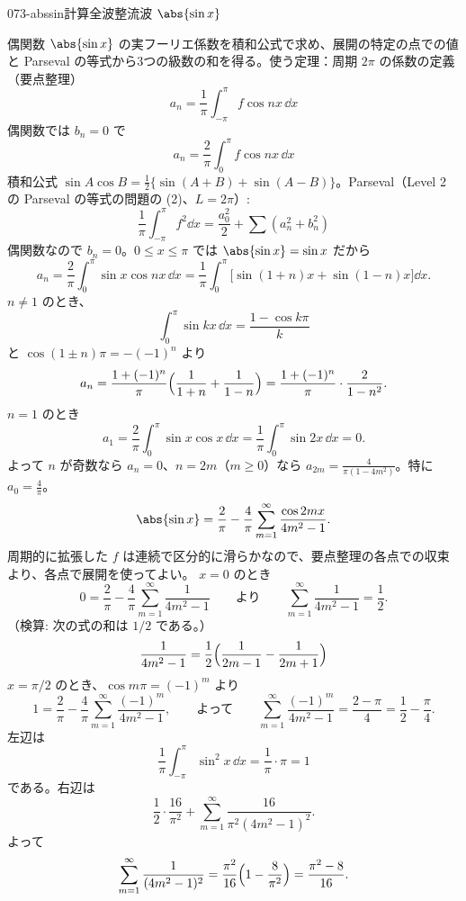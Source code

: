 \documentclass[uplatex,dvipdfmx,a4paper,11pt]{jsarticle}
\begin{document}
\begin{mondai}{073-abssin}{計算}{全波整流波 $\abs{\sin x}$}
\begin{kizuki}
\end{kizuki}
\begin{tadashii}
\houshin 偶関数 $\abs{\sin x}$ の実フーリエ係数を積和公式で求め、展開の特定の点での値と Parseval の等式から3つの級数の和を得る。使う定理：周期 $2\pi$ の係数の定義（要点整理）
\[
a_n=\frac{1}{\pi}\int_{-\pi}^{\pi}f\cos nx\,\dd x
\]
偶関数では $b_n=0$ で
\[
a_n=\frac{2}{\pi}\int_{0}^{\pi}f\cos nx\,\dd x
\]
積和公式 $\sin A\cos B=\frac{1}{2}\{\sin(A+B)+\sin(A-B)\}$。Parseval（Level 2 の Parseval の等式の問題の (2)、$L=2\pi$）:
\[
\frac{1}{\pi}\int_{-\pi}^{\pi}f^{2}\dd x=\frac{a_0^{2}}{2}+\sum(a_n^{2}+b_n^{2})
\]
\keisan
{} 偶関数なので $b_n=0$。$0\le x\le\pi$ では $\abs{\sin x}=\sin x$ だから
\[
a_n=\frac{2}{\pi}\int_{0}^{\pi}\sin x\cos nx\,\dd x=\frac{1}{\pi}\int_{0}^{\pi}\bigl[\sin(1+n)x+\sin(1-n)x\bigr]\dd x .
\]
$n\neq1$ のとき、
\[
\int_{0}^{\pi}\sin kx\,\dd x=\frac{1-\cos k\pi}{k}
\]
と $\cos(1\pm n)\pi=-(-1)^{n}$ より
\[
a_n=\frac{1+(-1)^{n}}{\pi}\Bigl(\frac{1}{1+n}+\frac{1}{1-n}\Bigr)=\frac{1+(-1)^{n}}{\pi}\cdot\frac{2}{1-n^{2}}.
\]
$n=1$ のとき
\[
a_1=\frac{2}{\pi}\int_{0}^{\pi}\sin x\cos x\,\dd x=\frac{1}{\pi}\int_0^{\pi}\sin2x\,\dd x=0 .
\]
よって $n$ が奇数なら $a_n=0$、$n=2m$（$m\ge0$）なら $a_{2m}=\frac{4}{\pi(1-4m^{2})}$。特に $a_0=\frac{4}{\pi}$。
\[
\abs{\sin x}=\frac{2}{\pi}-\frac{4}{\pi}\sum_{m=1}^{\infty}\frac{\cos2mx}{4m^{2}-1}.
\]
 周期的に拡張した $f$ は連続で区分的に滑らかなので、要点整理の各点での収束より、各点で展開を使ってよい。
$x=0$ のとき
\[
0=\frac{2}{\pi}-\frac{4}{\pi}\sum_{m=1}^{\infty}\frac{1}{4m^{2}-1}\qquad\text{より}\qquad\sum_{m=1}^{\infty}\frac{1}{4m^{2}-1}=\frac{1}{2}.
\]
（検算: 次の式の和は $1/2$ である。）
\[
\frac{1}{4m^{2}-1}=\frac{1}{2}\Bigl(\frac{1}{2m-1}-\frac{1}{2m+1}\Bigr)
\]
$x=\pi/2$ のとき、$\cos m\pi=(-1)^{m}$ より
\[
1=\frac{2}{\pi}-\frac{4}{\pi}\sum_{m=1}^{\infty}\frac{(-1)^{m}}{4m^{2}-1},\qquad\text{よって}\qquad\sum_{m=1}^{\infty}\frac{(-1)^{m}}{4m^{2}-1}=\frac{2-\pi}{4}=\frac{1}{2}-\frac{\pi}{4}.
\]
 左辺は
\[
\frac{1}{\pi}\int_{-\pi}^{\pi}\sin^{2}x\,\dd x=\frac{1}{\pi}\cdot\pi=1
\]
である。右辺は
\[
\frac{1}{2}\cdot\frac{16}{\pi^{2}}+\sum_{m=1}^{\infty}\frac{16}{\pi^{2}(4m^{2}-1)^{2}}.
\]
よって
\[
\sum_{m=1}^{\infty}\frac{1}{(4m^{2}-1)^{2}}=\frac{\pi^{2}}{16}\Bigl(1-\frac{8}{\pi^{2}}\Bigr)=\frac{\pi^{2}-8}{16}.
\]

\end{tadashii}
\end{mondai}
\end{document}
